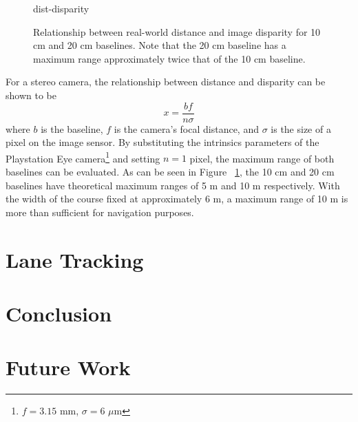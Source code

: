 \documentclass[11pt,twocolumn]{article}
\begin{document}
\begin{figure}
	{dist-disparity}
	\caption{
		Relationship between real-world distance and image disparity for
		10 cm and 20 cm baselines. Note that the 20 cm baseline has a maximum
		range approximately twice that of the 10 cm baseline.
	}
	\label{fig:stereo-dist-disparity}
\end{figure}

For a stereo camera, the relationship between distance and disparity can be
shown to be
\begin{equation*}
	x = \frac{bf}{n\sigma}
\end{equation*}
where $b$ is the baseline, $f$ is the camera's focal distance, and $\sigma$ is
the size of a pixel on the image sensor. By substituting the intrinsics
parameters of the Playstation Eye camera\footnote{$f = 3.15$ mm, $\sigma = 6$
$\mu$m} and setting $n = 1$ pixel, the maximum range of both baselines can be
evaluated. As can be seen in Figure ~\ref{fig:stereo-dist-disparity}, the 10 cm
and 20 cm baselines have theoretical maximum ranges of 5 m and 10 m
respectively. With the width of the course fixed at approximately 6 m, a
maximum range of 10 m is more than sufficient for navigation purposes.


\section{Lane Tracking}
\label{sec:lane}

\section{Conclusion}
\label{sec:conclusion}

\section{Future Work}
\label{sec:future}
\end{document}
